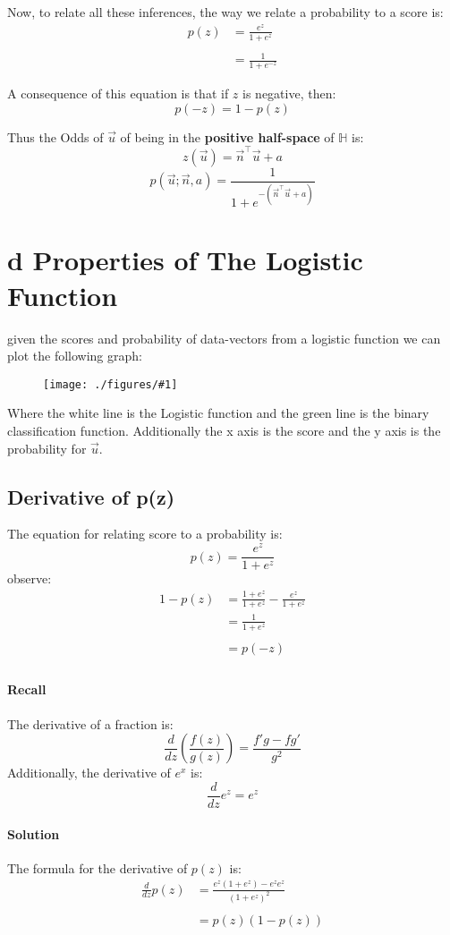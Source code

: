 \documentclass[12pt]{book}
\newcommand{\incimg}[2]{%
       \begin{figure}[h]
               \centering
               \texttt{[image: ./figures/\#1]}
       \end{figure}
}
\begin{document}
Now, to relate all these inferences, the way we relate a probability to
a score is:
\begin{align*}
        p(z) &= \frac{e^z}{1+e^z}\\
        \\
        &= \frac{1}{1+e^{-z}}
\end{align*}

A consequence of this equation is that if $z$ is negative, then:
\[p(-z) = 1-p(z)\]

Thus the Odds of $\vec u$ of being in the \textbf{positive half-space} of 
$\mathbb{H}$ is:
\[z(\vec u) = \vec n^\top \vec u + a\]
\[p(\vec u; \vec n, a) = \frac{1}{1+e^{-(\vec n^\top \vec u + a)}}\]

\section*{d Properties of The Logistic Function}
given the scores and probability of data-vectors from a logistic function we
can plot the following graph:
\incimg{logFunc}{0.5}

Where the white line is the Logistic function and the green line is the 
binary classification function.
Additionally the x axis is the score and the y axis is the probability 
for $\vec u$.

\subsection*{Derivative of p(z)}
The equation for relating score to a probability is:
\[p(z) = \frac{e^z}{1+e^z}\]
observe:
\begin{align*}
        1-p(z) &= \frac{1+e^z}{1+e^z}-\frac{e^z}{1+e^z}\\
               &= \frac{1}{1+e^z}\\
       \\
               &= p(-z)\\
\end{align*}

\paragraph{Recall}
The derivative of a fraction is:
\[\frac{d}{dz}\left(\frac{f(z)}{g(z)}\right) = \frac{f'g - fg'}{g^2}\]
Additionally, the derivative of $e^x$ is:
\[\frac{d}{dz}e^z = e^z\]

\paragraph{Solution}
The formula for the derivative of $p(z)$ is:
\begin{align*}
        \frac{d}{dz}p(z) &= \frac{e^z(1+e^z)-e^ze^z}{(1+e^z)^2}\\
        \\
        &= p(z)(1-p(z))
\end{align*}
\end{document}
